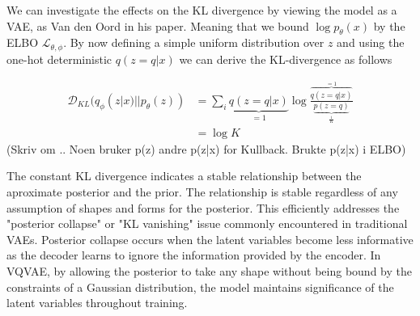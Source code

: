 We can investigate the effects on the KL divergence by viewing the model as a VAE, as Van den Oord in his paper. Meaning that we bound $\log p_\theta(x)$ by the ELBO $\mathcal{L}_{\theta, \phi}$.
By now defining a simple uniform distribution over $z$ and using the one-hot deterministic $q(z=q|x)$ we can derive the KL-divergence as follows

\begin{equation}
    \begin{aligned}
        \mathcal{D}_{KL}(q_\phi(z|x) || p_\theta(z)) &= \sum_i \underbrace{q(z=q|x)}_{=1} \log \frac{\overbrace{q(z=q|x)}^{=1}}{\underbrace{p(z=q)}_{\frac{1}{K}}} \\
        &= \log K
    \end{aligned}
\end{equation}
(Skriv om .. Noen bruker p(z) andre p(z|x) for Kullback. Brukte p(z|x) i ELBO)

The constant KL divergence indicates a stable relationship between the aproximate posterior and the prior. The relationship is stable regardless of any assumption of shapes and forms for the posterior. This efficiently
addresses the "posterior collapse" or "KL vanishing"\cite{posteriorcollapse} issue commonly encountered in traditional VAEs. Posterior collapse occurs when the latent variables become less informative as the decoder learns to ignore the information provided by the 
encoder. In VQVAE, by allowing the posterior to take any shape without being bound by the constraints of a Gaussian distribution, the model maintains significance of the latent variables throughout training. 
